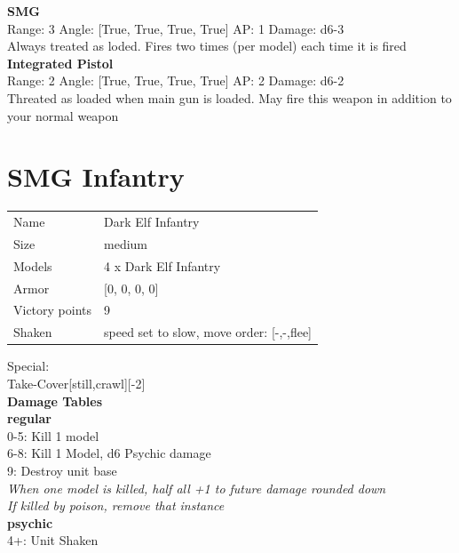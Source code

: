 {\bf SMG } \\



Range: 3  Angle: [True, True, True, True] AP: 1 Damage: d6-3 \\
Always treated as loded. Fires two times (per model) each time it is fired\\ 




{\bf Integrated Pistol } \\



Range: 2  Angle: [True, True, True, True] AP: 2 Damage: d6-2 \\
Threated as loaded when main gun is loaded. May fire this weapon in addition to your normal weapon\\ 




 















\clearpage

\section{ SMG Infantry }

\begin{tabular}{ll}
  Name & Dark Elf Infantry \\
  Size & medium\\
  Models & 4 x Dark Elf Infantry\\
  Armor & [0, 0, 0, 0]\\
  Victory points & 9\\
  Shaken & speed set to slow, move order: [-,-,flee]\\
\end{tabular}

Special:\\
Take-Cover[still,crawl][-2]\\ 



{\bf Damage Tables} \\
 {\bf regular } \\
0-5: Kill 1 model \\
6-8: Kill 1 Model, d6 Psychic damage \\
9: Destroy unit base \\
{{\it When one model is killed, half all +1 to future damage rounded down}} \\
{{\it If killed by poison, remove that instance}} \\
 {\bf psychic } \\
4+: Unit Shaken \\


